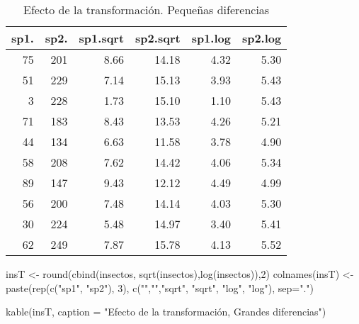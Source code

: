 \documentclass[
]{article}
\newenvironment{Shaded}{\begin{snugshade}}{\end{snugshade}}
\newcommand{\AttributeTok}[1]{\textcolor[rgb]{0.77,0.63,0.00}{#1}}
\newcommand{\DecValTok}[1]{\textcolor[rgb]{0.00,0.00,0.81}{#1}}
\newcommand{\FunctionTok}[1]{\textcolor[rgb]{0.00,0.00,0.00}{#1}}
\newcommand{\NormalTok}[1]{#1}
\newcommand{\OtherTok}[1]{\textcolor[rgb]{0.56,0.35,0.01}{#1}}
\newcommand{\StringTok}[1]{\textcolor[rgb]{0.31,0.60,0.02}{#1}}
\begin{document}
\begin{table}

\caption{\label{tab:unnamed-chunk-17}Efecto de la transformación. Pequeñas diferencias}
\centering
\begin{tabular}[t]{r|r|r|r|r|r}
\hline
sp1. & sp2. & sp1.sqrt & sp2.sqrt & sp1.log & sp2.log\\
\hline
75 & 201 & 8.66 & 14.18 & 4.32 & 5.30\\
\hline
51 & 229 & 7.14 & 15.13 & 3.93 & 5.43\\
\hline
3 & 228 & 1.73 & 15.10 & 1.10 & 5.43\\
\hline
71 & 183 & 8.43 & 13.53 & 4.26 & 5.21\\
\hline
44 & 134 & 6.63 & 11.58 & 3.78 & 4.90\\
\hline
58 & 208 & 7.62 & 14.42 & 4.06 & 5.34\\
\hline
89 & 147 & 9.43 & 12.12 & 4.49 & 4.99\\
\hline
56 & 200 & 7.48 & 14.14 & 4.03 & 5.30\\
\hline
30 & 224 & 5.48 & 14.97 & 3.40 & 5.41\\
\hline
62 & 249 & 7.87 & 15.78 & 4.13 & 5.52\\
\hline
\end{tabular}
\end{table}

\begin{Shaded}
\begin{Highlighting}[]
\NormalTok{insT }\OtherTok{\textless{}{-}} \FunctionTok{round}\NormalTok{(}\FunctionTok{cbind}\NormalTok{(insectos, }\FunctionTok{sqrt}\NormalTok{(insectos),}\FunctionTok{log}\NormalTok{(insectos)),}\DecValTok{2}\NormalTok{) }
\FunctionTok{colnames}\NormalTok{(insT) }\OtherTok{\textless{}{-}} \FunctionTok{paste}\NormalTok{(}\FunctionTok{rep}\NormalTok{(}\FunctionTok{c}\NormalTok{(}\StringTok{"sp1"}\NormalTok{, }\StringTok{"sp2"}\NormalTok{), }\DecValTok{3}\NormalTok{), }\FunctionTok{c}\NormalTok{(}\StringTok{""}\NormalTok{,}\StringTok{""}\NormalTok{,}\StringTok{"sqrt"}\NormalTok{, }\StringTok{"sqrt"}\NormalTok{, }\StringTok{"log"}\NormalTok{, }\StringTok{"log"}\NormalTok{), }\AttributeTok{sep=}\StringTok{"."}\NormalTok{)}

\FunctionTok{kable}\NormalTok{(insT, }\AttributeTok{caption =} \StringTok{"Efecto de la transformación, Grandes diferencias"}\NormalTok{)}
\end{Highlighting}
\end{Shaded}
\end{document}
